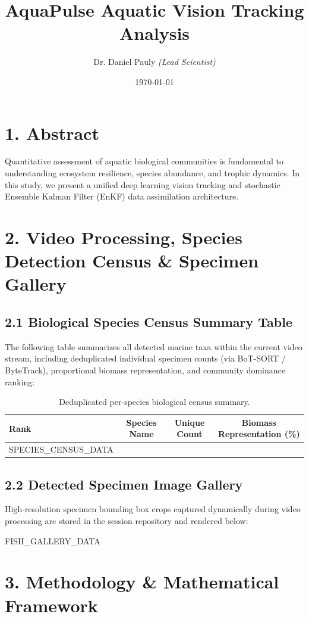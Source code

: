 \documentclass[11pt,a4paper]{article}
\title{\textbf{AquaPulse Aquatic Vision Tracking Analysis}}
\author{Dr. Daniel Pauly \textit{(Lead Scientist)}}
\date{\today}
\begin{document}
\maketitle

\section*{1. Abstract}
Quantitative assessment of aquatic biological communities is fundamental to understanding ecosystem resilience, species abundance, and trophic dynamics. In this study, we present a unified deep learning vision tracking and stochastic Ensemble Kalman Filter (EnKF) data assimilation architecture.

\section*{2. Video Processing, Species Detection Census \& Specimen Gallery}
\subsection*{2.1 Biological Species Census Summary Table}
The following table summarizes all detected marine taxa within the current video stream, including deduplicated individual specimen counts (via BoT-SORT / ByteTrack), proportional biomass representation, and community dominance ranking:

\begin{table}[h!]
\centering
\begin{tabular}{lccc}
\toprule
\textbf{Rank} & \textbf{Species Name} & \textbf{Unique Count} & \textbf{Biomass Representation (\%)} \\
\midrule
{{SPECIES_CENSUS_DATA}}
\bottomrule
\end{tabular}
\caption{Deduplicated per-species biological census summary.}
\end{table}

\subsection*{2.2 Detected Specimen Image Gallery}
High-resolution specimen bounding box crops captured dynamically during video processing are stored in the session repository and rendered below:

{{FISH_GALLERY_DATA}}

\section*{3. Methodology \& Mathematical Framework}
\end{document}
